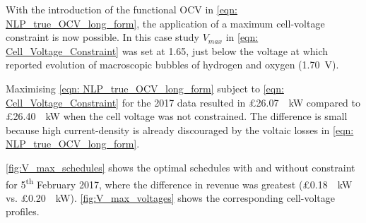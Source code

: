 \documentclass[preprint,3p,review,authoryear,10pt]{elsarticle}
\begin{document}
With the introduction of the functional OCV in \cref{eqn: NLP_true_OCV_long_form}, the application of a maximum cell-voltage constraint is now possible. In this case study $V_{max}$ in \cref{eqn: Cell_Voltage_Constraint} was set at 1.65, just below the voltage at which \cite{Wei2017} reported evolution of macroscopic bubbles of hydrogen and oxygen (\SI{1.70}{\volt}). 

Maximising \cref{eqn: NLP_true_OCV_long_form} subject to \cref{eqn: Cell_Voltage_Constraint} for the 2017 data resulted in \pounds \SI{26.07}{\per\kilo\watt} compared to \pounds \SI{26.40}{\per\kilo\watt} when the cell voltage was not constrained. The difference is small because high current-density is already discouraged by the voltaic losses in \cref{eqn: NLP_true_OCV_long_form}. 

\cref{fig:V_max_schedules} shows the optimal schedules with and without constraint for 5\textsuperscript{th} February 2017, where the difference in revenue was greatest (\pounds \SI{0.18}{\per\kilo\watt} vs. \pounds \SI{0.20}{\per\kilo\watt}). \cref{fig:V_max_voltages} shows the corresponding cell-voltage profiles.
\end{document}
